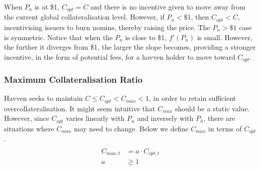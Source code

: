 \noindent When $P_n$ is at \$1, $C_{opt} = C$ and there is no incentive given to move away from the current global collateralisation level. However, if $P_n < \$1$, then $C_{opt} < C$, incentivising issuers to burn nomins, thereby raising the price. The $P_n > \$1$ case is symmetric. Notice that when the $P_n$ is close to \$1, $ f'(P_n) $ is small. However, the further it diverges from \$1, the larger the slope becomes, providing a stronger incentive, in the form of potential fees, for a havven holder to move toward $C_{opt}$. \\

\newpage

\subsubsection{Maximum Collateralisation Ratio}

\noindent Havven seeks to maintain $C \leq C_{opt} < C_{max} < 1$, in order to retain sufficient overcollateralisation. It might seem intuitive that $C_{max}$ should be a static value. However, since $C_{opt}$ varies linearly with $P_n$ and inversely with $P_h$,  there are situations where $C_{max}$ may need to change. Below we define $C_{max}$ in terms of $C_{opt}$. \\

\begin{gather} \label{eq:maxcollateralisation}
\begin{align}
\begin{split}
C_{max,t} &=  a \cdot C_{opt,t} \\ 
a & \geq 1 \\
\end{split}
\end{align}
\end{gather}

\begin{center}
\end{center}


